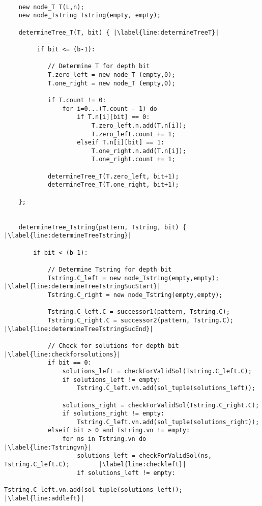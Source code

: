 \begin{lstlisting}[caption={The \texttt{3SUM} frame algorithm}, label=lst:3sumframealgorithm]

    new node_T T(L,n);
    new node_Tstring Tstring(empty, empty);

    determineTree_T(T, bit) { |\label{line:determineTreeT}|

         if bit <= (b-1):
            
            // Determine T for depth bit
            T.zero_left = new node_T (empty,0);
            T.one_right = new node_T (empty,0);

            if T.count != 0:
                for i=0...(T.count - 1) do
                    if T.n[i][bit] == 0:
                        T.zero_left.n.add(T.n[i]);
                        T.zero_left.count += 1;
                    elseif T.n[i][bit] == 1:
                        T.one_right.n.add(T.n[i]);
                        T.one_right.count += 1;

            determineTree_T(T.zero_left, bit+1);
            determineTree_T(T.one_right, bit+1);

    };


    determineTree_Tstring(pattern, Tstring, bit) {   |\label{line:determineTreeTstring}|

        if bit < (b-1):

            // Determine Tstring for depth bit
            Tstring.C_left = new node_Tstring(empty,empty);     |\label{line:determineTreeTstringSucStart}|
            Tstring.C_right = new node_Tstring(empty,empty);        
         
            Tstring.C_left.C = successor1(pattern, Tstring.C);
            Tstring.C_right.C = successor2(pattern, Tstring.C);      |\label{line:determineTreeTstringSucEnd}|

            // Check for solutions for depth bit            |\label{line:checkforsolutions}|
            if bit == 0:
                solutions_left = checkForValidSol(Tstring.C_left.C);
                if solutions_left != empty:
                    Tstring.C_left.vn.add(sol_tuple(solutions_left));

                solutions_right = checkForValidSol(Tstring.C_right.C);
                if solutions_right != empty:
                    Tstring.C_left.vn.add(sol_tuple(solutions_right));
            elseif bit > 0 and Tstring.vn != empty:
                for ns in Tstring.vn do                         |\label{line:Tstringvn}|
                    solutions_left = checkForValidSol(ns, Tstring.C_left.C);        |\label{line:checkleft}|
                    if solutions_left != empty:
                        Tstring.C_left.vn.add(sol_tuple(solutions_left));           |\label{line:addleft}|


\end{lstlisting}
